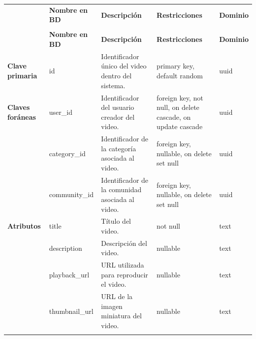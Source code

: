 \begin{longtable}{|
>{\raggedright\arraybackslash}p{1.9cm}|
>{\raggedright\arraybackslash}p{2.7cm}|
>{\raggedright\arraybackslash}p{4.9cm}|
>{\raggedright\arraybackslash}p{2.7cm}|
>{\raggedright\arraybackslash}p{2.1cm}|
}
\hline

\rowcolor[gray]{0.75}
\multicolumn{5}{|c|}{\textbf{Videos}} \\
\hline

 & \textbf{Nombre en BD} & \textbf{Descripción} & \textbf{Restricciones} & \textbf{Dominio} \\
\hline
\endfirsthead

\hline
\rowcolor[gray]{0.75}
\multicolumn{5}{|c|}{\textbf{Videos}} \\
\hline

 & \textbf{Nombre en BD} & \textbf{Descripción} & \textbf{Restricciones} & \textbf{Dominio} \\
\hline
\endhead

\textbf{Clave primaria}
& id
& Identificador único del video dentro del sistema.
& primary key, default random
& uuid \\
\hline

\textbf{Claves foráneas}
& user\_\allowbreak id
& Identificador del usuario creador del video.
& foreign key, not null, on delete cascade, on update cascade
& uuid \\
\cline{2-5}

& category\_\allowbreak id
& Identificador de la categoría asociada al video.
& foreign key, nullable, on delete set null
& uuid \\
\cline{2-5}

& community\_\allowbreak id
& Identificador de la comunidad asociada al video.
& foreign key, nullable, on delete set null
& uuid \\
\hline

\textbf{Atributos}
& title
& Título del video.
& not null
& text \\
\cline{2-5}

& description
& Descripción del video.
& nullable
& text \\
\cline{2-5}

& playback\_\allowbreak url
& URL utilizada para reproducir el video.
& nullable
& text \\
\cline{2-5}

& thumbnail\_\allowbreak url
& URL de la imagen miniatura del video.
& nullable
& text \\
\cline{2-5}


\end{longtable}
